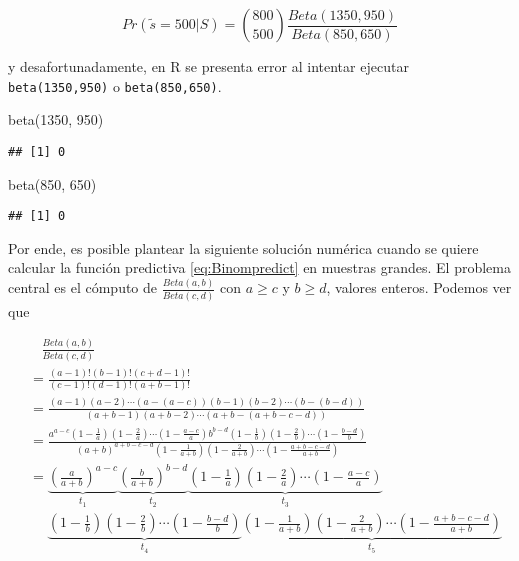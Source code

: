 \documentclass[
  spanish,
]{book}
\newenvironment{Shaded}{\begin{snugshade}}{\end{snugshade}}
\newcommand{\DecValTok}[1]{\textcolor[rgb]{0.00,0.00,0.81}{#1}}
\newcommand{\FunctionTok}[1]{\textcolor[rgb]{0.00,0.00,0.00}{#1}}
\newcommand{\NormalTok}[1]{#1}
\theoremstyle{definition}
\theoremstyle{definition}
\theoremstyle{definition}
\theoremstyle{definition}
\theoremstyle{remark}
\begin{document}
\begin{equation}
\label{eq:Ejebinom}
Pr(\tilde{s}=500|S)=
\binom{800}{500}\frac{Beta(1350,950)}{Beta(850,650)}
\end{equation}

y desafortunadamente, en \textsf{R} se presenta error al intentar
ejecutar \texttt{beta(1350,950)} o \texttt{beta(850,650)}.

\begin{Shaded}
\begin{Highlighting}[]
\FunctionTok{beta}\NormalTok{(}\DecValTok{1350}\NormalTok{, }\DecValTok{950}\NormalTok{)}
\end{Highlighting}
\end{Shaded}

\begin{verbatim}
## [1] 0
\end{verbatim}

\begin{Shaded}
\begin{Highlighting}[]
\FunctionTok{beta}\NormalTok{(}\DecValTok{850}\NormalTok{, }\DecValTok{650}\NormalTok{)}
\end{Highlighting}
\end{Shaded}

\begin{verbatim}
## [1] 0
\end{verbatim}

Por ende, es posible plantear la
siguiente solución numérica cuando se quiere calcular la función
predictiva \eqref{eq:Binompredict} en muestras grandes. El problema
central es el cómputo de \(\frac{Beta(a,b)}{Beta(c,d)}\) con \(a \geq c\) y
\(b \geq d\), valores enteros. Podemos ver que

\begin{align*}
&\ \ \ \ \frac{Beta(a,b)}{Beta(c,d)}\\
&=\frac{(a-1)!(b-1)!(c+d-1)!}{(c-1)!(d-1)!(a+b-1)!}\\
&=\frac{(a-1)(a-2)\cdots(a-(a-c))(b-1)(b-2)\cdots(b-(b-d))}{(a+b-1)(a+b-2)\cdots(a+b-(a+b-c-d))}\\
&=\frac{a^{a-c}(1-\frac{1}{a})(1-\frac{2}{a})\cdots(1-\frac{a-c}{a})b^{b-d}(1-\frac{1}{b})(1-\frac{2}{b})\cdots(1-\frac{b-d}{b})}{(a+b)^{a+b-c-d}(1-\frac{1}{a+b})(1-\frac{2}{a+b})\cdots(1-\frac{a+b-c-d}{a+b})}\\
&=\underbrace{\left(\frac{a}{a+b}\right)^{a-c}}_{t_1}\underbrace{\left(\frac{b}{a+b}\right)^{b-d}}_{t_2}\underbrace{(1-\frac{1}{a})(1-\frac{2}{a})\cdots(1-\frac{a-c}{a})}_{t_3}\\
&\ \ \ \ \ \ \underbrace{(1-\frac{1}{b})(1-\frac{2}{b})\cdots(1-\frac{b-d}{b})}_{t_4}\underbrace{(1-\frac{1}{a+b})(1-\frac{2}{a+b})\cdots(1-\frac{a+b-c-d}{a+b})}_{t_5}
\end{align*}
\end{document}
